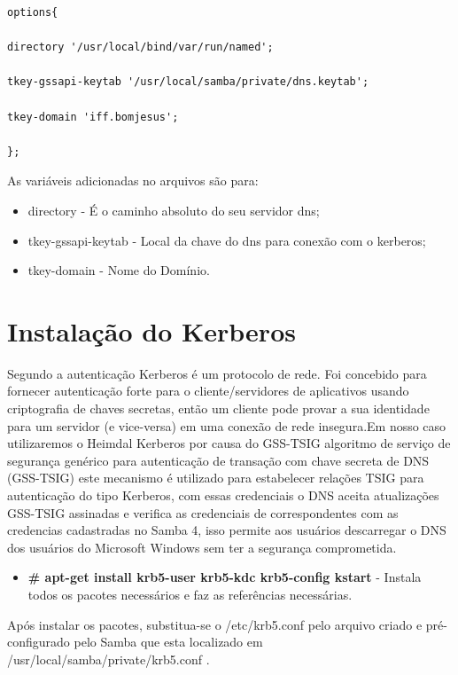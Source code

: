 \begin{lstlisting}[caption=Arquivo named.options,label={named_options}]
options{ 
	
directory '/usr/local/bind/var/run/named'; 

tkey-gssapi-keytab '/usr/local/samba/private/dns.keytab'; 

tkey-domain 'iff.bomjesus';
	
};
\end{lstlisting}

As variáveis adicionadas no arquivos são para:

\begin{itemize}
	\item{directory} -  É o caminho absoluto do seu servidor dns;
	\item{tkey-gssapi-keytab} - Local da chave do dns para conexão com o kerberos;
	\item{tkey-domain} - Nome do Domínio.
\end{itemize}

\section{Instalação do Kerberos}

Segundo  a autenticação Kerberos é um protocolo de rede. Foi concebido para fornecer autenticação forte para o cliente/servidores de aplicativos usando criptografia de chaves secretas, então um cliente pode provar a sua identidade para um servidor (e vice-versa) em uma conexão de rede insegura.Em nosso caso utilizaremos o Heimdal Kerberos por causa do GSS-TSIG algoritmo de serviço de segurança genérico para autenticação de transação com chave secreta de DNS (GSS-TSIG) este mecanismo é utilizado para estabelecer relações TSIG para autenticação do tipo Kerberos, com essas credenciais o DNS aceita atualizações GSS-TSIG assinadas e verifica as credenciais de correspondentes com as credencias cadastradas no Samba 4, isso permite aos usuários descarregar o DNS dos usuários do Microsoft Windows sem ter a segurança comprometida.

\begin{itemize}
	\item \textbf{\# apt-get install krb5-user krb5-kdc krb5-config kstart} - Instala todos os pacotes necessários e faz as referências necessárias.
\end{itemize}

Após instalar os pacotes, substitua-se o /etc/krb5.conf pelo arquivo criado e pré-configurado pelo Samba que esta localizado em /usr/local/samba/private/krb5.conf .

